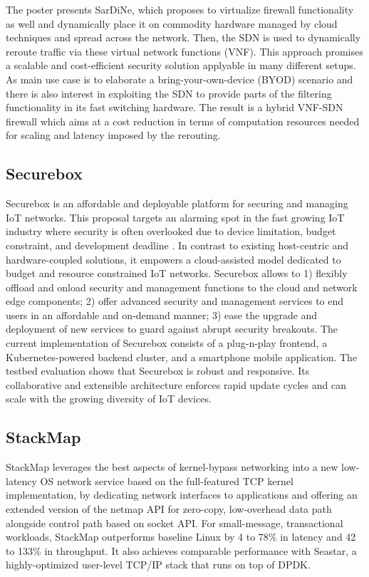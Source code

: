 The poster presents SarDiNe, which proposes to virtualize firewall
functionality as well and dynamically place it on commodity hardware managed
by cloud techniques and spread across the network. Then, the SDN is used to
dynamically reroute traffic via these virtual network functions (VNF). This
approach promises a scalable and cost-efficient security solution applyable in
many different setups. As main use case is to elaborate a
bring-your-own-device (BYOD) scenario and there is also interest in exploiting
the \ac{SDN} to provide parts of the filtering functionality in its fast
switching hardware. The result is a hybrid VNF-SDN firewall which aims at a
cost reduction in terms of computation resources needed for scaling and
latency imposed by the rerouting.

\subsection{Securebox}

Securebox \cite{hafeez:can:2016, hafeez:s3:2015} is an affordable and 
deployable platform for securing and managing
IoT networks. This proposal targets an alarming spot in the fast growing IoT
industry where security is often overlooked due to device limitation, budget
constraint, and development deadline \cite{haus:comst:2017}. 
In contrast to existing host-centric and
hardware-coupled solutions, it empowers a cloud-assisted model dedicated to
budget and resource constrained IoT networks. Securebox allows to 1) flexibly
offload and onload security and management functions to the cloud and network
edge components; 2) offer advanced security and management services to end
users in an affordable and on-demand manner; 3) ease the upgrade and
deployment of new services to guard against abrupt security breakouts. The
current implementation of Securebox consists of a plug-n-play frontend, a
Kubernetes-powered backend cluster, and a smartphone mobile application. The
testbed evaluation shows that Securebox is robust and responsive. Its
collaborative and extensible architecture enforces rapid update cycles and can
scale with the growing diversity of IoT devices.

\subsection{StackMap}

StackMap \cite{kyasukata:atc:2016} leverages the best aspects of kernel-bypass
networking into a new low-latency OS network service based on the
full-featured TCP kernel implementation, by dedicating network interfaces to
applications and offering an extended version of the netmap API for zero-copy,
low-overhead data path alongside control path based on socket API. For
small-message, transactional workloads, StackMap outperforms baseline Linux by
4 to 78\% in latency and 42 to 133\% in throughput.  It also achieves
comparable performance with Seastar, a highly-optimized user-level TCP/IP
stack that runs on top of DPDK.

